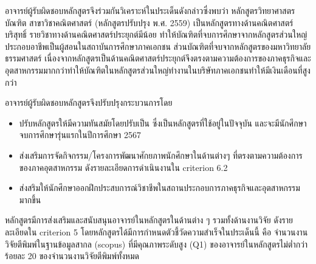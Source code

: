 อาจารย์ผู้รับผิดชอบหลักสูตรจึงร่วมกันวิเคราะห์ในประเด็นดังกล่าวซึ่งพบว่า หลักสูตรวิทยาศาสตรบัณฑิต สาขาวิชาคณิตศาสตร์ (หลักสูตรปรับปรุง พ.ศ. 2559) เป็นหลักสูตรทางด้านคณิตศาสตร์บริสุทธิ์ รายวิชาทางด้านคณิตศาสตร์ประยุกต์มีน้อย ทำให้บัณฑิตที่จบการศึกษาจากหลักสูตรส่วนใหญ่ประกอบอาชีพเป็นผู้สอนในสถาบันการศึกษาภาคเอกชน ส่วนบัณฑิตที่จบจากหลักสูตรของมหาวิทยาลัยธรรมศาสตร์ เนื่องจากหลักสูตรเป็นด้านคณิตศาสตร์ประยุกต์จึงตรงตามความต้องการของภาคธุรกิจและอุตสาหกรรมมากกว่าทำให้บัณฑิตในหลักสูตรส่วนใหญ่ทำงานในบริษัทภาคเอกชนทำให้มีเงินเดือนที่สูงกว่า

อาจารย์ผู้รับผิดชอบหลักสูตรจึงปรับปรุงกระบวนการโดย
\begin{itemize}
	\item ปรับหลักสูตรให้มีความทันสมัยโดยปรับเป็น \printprogram{} ซึ่งเป็นหลักสูตรที่ใช้อยู่ในปัจจุบัน และจะมีนักศึกษาจบการศึกษารุ่นแรกในปีการศึกษา 2567
	\item ส่งเสริมการจัดกิจกรรม/โครงการพัฒนาศักยภาพนักศึกษาในด้านต่างๆ ที่ตรงตามความต้องการของภาคอุตสาหกรรม ดังรายละเอียดการดำเนินงานใน criterion 6.2
	\item ส่งสริมให้นักศึกษาออกฝึกประสบการณ์วิชาชีพในสถานประกอบการภาคธุรกิจและอุตสาหกรรมมากขึ้น
\end{itemize}
\begin{doclist}
\end{doclist}

หลักสูตรมีการส่งเสริมและสนับสนุนอาจารย์ในหลักสูตรในด้านต่าง ๆ รวมทั้งด้านงานวิจัย ดังรายละเอียดใน criterion 5 โดยหลักสูตรได้มีการกำหนดตัวชี้วัดความสำเร็จในประเด็นนี้ คือ จำนวนงานวิจัยตีพิมพ์ในฐานข้อมูลสากล (scopus) ที่มีคุณภาพระดับสูง (Q1) ของอาจารย์ในหลักสูตรไม่ต่ำกว่าร้อยละ 20 ของจำนวนงานวิจัยตีพิมพ์ทั้งหมด

